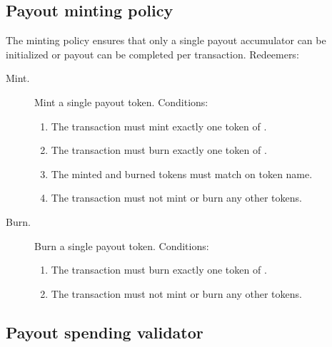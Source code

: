 \documentclass[../midgard.tex]{subfiles}
\begin{document}
\subsection{Payout minting policy}%
\label{h:payout-minting-policy}%

The  minting policy ensures that only a single payout accumulator can be initialized or payout can be completed per transaction.
Redeemers:
\begin{description}
  \item[Mint.] Mint a single payout token.
    Conditions:
    \begin{enumerate}
      \item The transaction must mint exactly one token of .
      \item The transaction must burn exactly one token of .
      \item The minted and burned tokens must match on token name.
      \item The transaction must not mint or burn any other tokens.
    \end{enumerate}
  \item[Burn.] Burn a single payout token.
    Conditions:
    \begin{enumerate}
      \item The transaction must burn exactly one token of .
      \item The transaction must not mint or burn any other tokens.
    \end{enumerate}
\end{description}

\subsection{Payout spending validator}%
\label{h:payout-spending-validator}%
\end{document}
